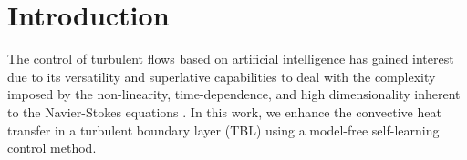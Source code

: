 

\section{Introduction}\label{s:intro}
The control of turbulent flows based on artificial intelligence has gained interest due to its versatility and superlative capabilities to deal with the complexity imposed by the non-linearity, time-dependence, and high dimensionality inherent to the Navier-Stokes equations \citep{BruntonNoackKoumoutsakos2020}. In this work, we enhance the convective heat transfer in a turbulent boundary layer (TBL) using a model-free self-learning control method. 


